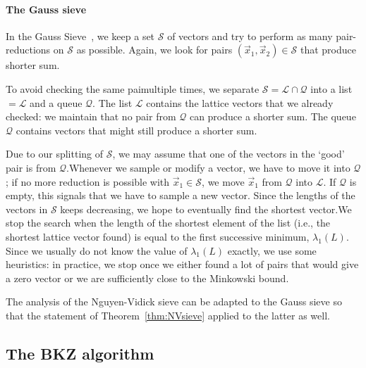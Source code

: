 \paragraph{The Gauss sieve}
 
In the Gauss Sieve~\cite{MV10}, we keep a set $\mathcal{S}$ of vectors and try to perform as many pair-reductions on $\mathcal{S}$ as possible. Again, we look for pairs $(\vec x_1, \vec x_2)\in \mathcal{S}$ that produce shorter sum.

To avoid checking the same paimultiple times, we separate $\mathcal{S}=\mathcal{L} \cap \mathcal{Q}$ into a list $=\mathcal{L} $ and a queue $\mathcal{Q}$. The list $\mathcal{L}$ contains the lattice vectors that we already checked: we maintain that no pair from $\mathcal{Q}$ can produce a shorter sum. The queue $\mathcal{Q}$ contains vectors that might still produce a shorter sum.
 
Due to our splitting of $\mathcal{S}$, we may assume that one of the vectors in the `good' pair is from $\mathcal{Q}$.Whenever we sample or modify a vector, we have to move it into $\mathcal{Q}$; if no more reduction is possible with $\vec x_1 \in \mathcal{S}$, we move $\vec x_1$ from $\mathcal{Q}$ into $\mathcal{L}$.  If $\mathcal{Q}$ is empty, this signals that we have to sample a new vector.
Since the lengths of the vectors in $\mathcal{S}$ keeps decreasing, we hope to eventually find the shortest vector.We stop the search when the length of the shortest element of the list (i.e., the shortest lattice vector found) is equal to the first successive minimum, $\lambda_1(L)$.
Since we usually do not know the value of $\lambda_1(L)$ exactly, we use some heuristics:  in practice, we stop once we either found a lot of pairs that would give a zero vector or we are sufficiently close to the Minkowski bound.

The analysis of the Nguyen-Vidick sieve can be adapted to the Gauss sieve so that the statement of Theorem~\ref{thm:NVsieve} applied to the latter as well.
 
 

\subsection{The BKZ algorithm} 
